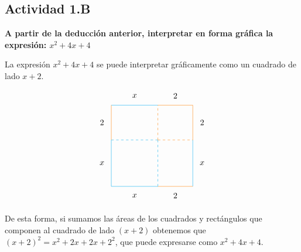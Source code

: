 \subsection*{Actividad 1.B}
\textbf{A partir de la deducción anterior, interpretar en forma gráfica la expresión: $x^2 + 4x + 4$}

La expresión $x^2 + 4x + 4$ se puede interpretar gráficamente como un cuadrado de lado $x + 2$.

\begin{align*}
	\begin{tikzpicture}
		\draw[cyan] (0,0) -- (2,0);
		\draw[cyan] (0,0) -- (0,2);
		\draw[cyan,dashed] (2,0) -- (2,2);
		\draw[cyan,dashed] (0,2) -- (2,2);
		\draw (1, -0.4) node{$x$};
		\draw (-0.4, 1) node{$x$};
		\draw[orange,dashed] (2,2) -- (3.5,2);
		\draw[orange,dashed] (2,2) -- (2,3.5);
		\draw[orange] (3.5,2) -- (3.5,3.5);
		\draw[orange] (2,3.5) -- (3.5,3.5);
		\draw (3.9, 2.75) node{$2$};
		\draw (2.75, 3.9) node{$2$};
		\draw[orange] (2,0) -- (3.5,0);
		\draw (2.75, -0.4) node{$2$};
		\draw[cyan] (3.5, 0) -- (3.5, 2);
		\draw (3.9, 1) node{$x$};
		\draw[cyan] (0, 3.5) -- (2, 3.5);
		\draw (1, 3.9) node{$x$};
		\draw[orange] (0, 2) -- (0, 3.5);
		\draw (-0.4, 2.75) node{$2$};
	\end{tikzpicture}
\end{align*}

De esta forma, si sumamos las áreas de los cuadrados y rectángulos que componen al cuadrado de lado $(x+2)$ obtenemos que $(x+2)^2 = x^2 + 2x + 2x + 2^2$, que puede expresarse como $x^2 + 4x +4$.
